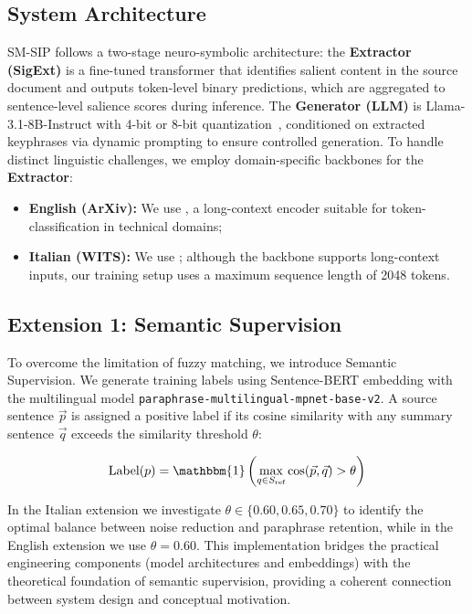 \documentclass[conference]{IEEEtran}
\begin{document}
\subsection{System Architecture}

SM-SIP follows a two-stage neuro-symbolic architecture: the \textbf{Extractor (SigExt)} is a fine-tuned transformer that identifies salient content in the source document and outputs token-level binary predictions, which are aggregated to sentence-level salience scores during inference. The \textbf{Generator (LLM)} is Llama-3.1-8B-Instruct with 4-bit or 8-bit quantization~\cite{dettmers2022llmint8}, conditioned on extracted keyphrases via dynamic prompting to ensure controlled generation. To handle distinct linguistic challenges, we employ domain-specific backbones for the \textbf{Extractor}: 
\begin{itemize}
    \item  \textbf{English (ArXiv):} We use , a long-context encoder suitable for token-classification in technical domains;
    \item  \textbf{Italian (WITS):} We use ; although the backbone supports long-context inputs, our training setup uses a maximum sequence length of 2048 tokens.
\end{itemize}

\subsection{Extension 1: Semantic Supervision}
\label{sec:semantic}

To overcome the limitation of fuzzy matching, we introduce Semantic Supervision. We generate training labels using Sentence-BERT embedding with the multilingual model \texttt{paraphrase-multilingual-mpnet-base-v2}. A source sentence  $\vec{p}$ is assigned a positive label if its cosine similarity with any summary sentence $\vec{q}$ exceeds the similarity threshold $\theta$:

$$\text{Label}(p) = \mathbbm{1}\left( \max_{q \in S_{\text{ref}}} \cos(\vec{p}, \vec{q}) > \theta \right)$$

In the Italian extension we investigate $\theta \in \{0.60, 0.65, 0.70\}$ to identify the optimal balance between noise reduction and paraphrase retention, while in the English extension we use $\theta=0.60$. This implementation bridges the practical engineering components (model architectures and embeddings) with the theoretical foundation of semantic supervision, providing a coherent connection between system design and conceptual motivation.
\end{document}

